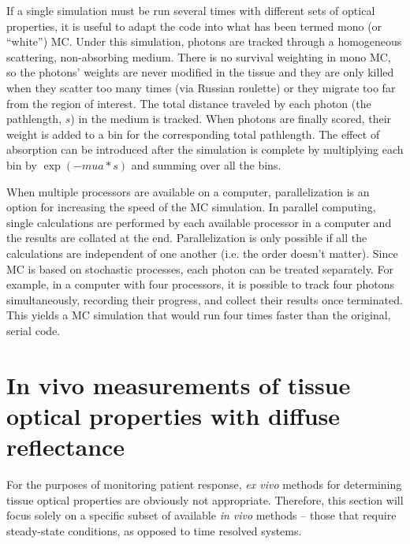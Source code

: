 If a single simulation must be run several times with different sets of optical properties, it is useful to adapt the code into what has been termed mono (or “white”) MC.\cite{Alerstam2013} Under this simulation, photons are tracked through a homogeneous scattering, non-absorbing medium. There is no survival weighting in mono MC, so the photons' weights are never modified in the tissue and they are only killed when they scatter too many times (via Russian roulette) or they migrate too far from the region of interest. The total distance traveled by each photon (the pathlength, $s$) in the medium is tracked. When photons are finally scored, their weight is added to a bin for the corresponding total pathlength. The effect of absorption can be introduced after the simulation is complete by multiplying each bin by $\exp(-mua*s)$ and summing over all the bins.

When multiple processors are available on a computer, parallelization is an option for increasing the speed of the MC simulation. In parallel computing, single calculations are performed by each available processor in a computer and the results are collated at the end. Parallelization is only possible if all the calculations are independent of one another (i.e. the order doesn't matter). Since MC is based on stochastic processes, each photon can be treated separately. For example, in a computer with four processors, it is possible to track four photons simultaneously, recording their progress, and collect their results once terminated. This yields a MC simulation that would run four times faster than the original, serial code.

\section{In vivo measurements of tissue optical properties with diffuse reflectance}
\label{sec:diff_refl}
For the purposes of monitoring patient response, \emph{ex vivo} methods for determining tissue optical properties are obviously not appropriate. Therefore, this section will focus solely on a specific subset of available \emph{in vivo} methods – those that require steady-state conditions, as opposed to time resolved systems.

